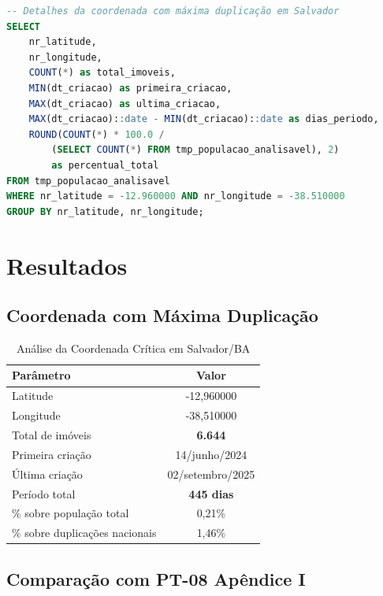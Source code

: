 \documentclass[11pt,a4paper]{article}
\begin{document}
\begin{lstlisting}[language=SQL, caption={Análise de duplicações em Salvador sobre população total}]
-- Detalhes da coordenada com máxima duplicação em Salvador
SELECT
    nr_latitude,
    nr_longitude,
    COUNT(*) as total_imoveis,
    MIN(dt_criacao) as primeira_criacao,
    MAX(dt_criacao) as ultima_criacao,
    MAX(dt_criacao)::date - MIN(dt_criacao)::date as dias_periodo,
    ROUND(COUNT(*) * 100.0 /
        (SELECT COUNT(*) FROM tmp_populacao_analisavel), 2)
        as percentual_total
FROM tmp_populacao_analisavel
WHERE nr_latitude = -12.960000 AND nr_longitude = -38.510000
GROUP BY nr_latitude, nr_longitude;
\end{lstlisting}

\section{Resultados}

\subsection{Coordenada com Máxima Duplicação}

\begin{table}[H]
\centering
\caption{Análise da Coordenada Crítica em Salvador/BA}
\label{tab:salvador}
\begin{tabular}{lc}
\toprule
\textbf{Parâmetro} & \textbf{Valor} \\
\midrule
Latitude & -12,960000 \\
Longitude & -38,510000 \\
\midrule
Total de imóveis & \textbf{6.644} \\
Primeira criação & 14/junho/2024 \\
Última criação & 02/setembro/2025 \\
Período total & \textbf{445 dias} \\
\midrule
\% sobre população total & 0,21\% \\
\% sobre duplicações nacionais & 1,46\% \\
\bottomrule
\end{tabular}
\end{table}

\subsection{Comparação com PT-08 Apêndice I}
\end{document}
